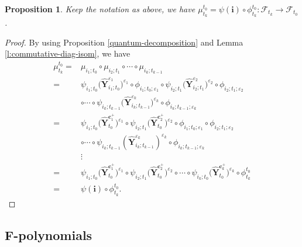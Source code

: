\documentclass[11pt]{article}
\numberwithin{equation}{section}
\numberwithin{equation}{section}
\newtheorem{Proposition}[Theorem]{Proposition}
 { \theoremstyle{definition}
\newtheorem{Definition}[Theorem]{Definition}
\newtheorem{Note}[Theorem]{Note}
\newtheorem{Example}[Theorem]{Example}
\newtheorem{Remark}[Theorem]{Remark} }
\begin{document}
\begin{Proposition}\label{long-quantum-decomposition}
 Keep the notation as above, we have
 $\mu_{t_k}^{t_0}=\psi(\mathbf{i})\circ\phi_{t_{k}}^{t_0}\colon  \mathcal{F}_{t_{k}}\to\mathcal{F}_{t_{0}}$.
\end{Proposition}
\begin{proof}
 By using Proposition \ref{quantum-decomposition} and Lemma \ref{l:commutative-diag-isom}, we have
 \begin{align*}
 \mu_{t_k}^{t_0}
 ={}&\mu_{i_1;t_0}\circ\mu_{i_2;t_1}\circ\cdots\circ\mu_{i_k;t_{k-1}}\\
 ={}&\psi_{i_{1};t_{0}}\bigl(\mathbf{\hat{Y}}_{i_{1};t_{0}}^{\varepsilon_{1}}\bigr)^{\varepsilon_{1}}\circ\phi_{i_{1};t_{0};\varepsilon_{1}}\circ\psi_{i_{2};t_{1}}
 \bigl(\mathbf{\hat{Y}}_{i_{2};t_{1}}^{\varepsilon_{2}}\bigr)^{\varepsilon_{2}}\circ\phi_{i_{2};t_{1};\varepsilon_{2}}\\
 &\circ\cdots\circ\psi_{i_{k};t_{k-1}}
 \bigl(\mathbf{\hat{Y}}_{i_{k};t_{k-1}}^{\varepsilon_{k}}\bigr)^{\varepsilon_{k}}\circ\phi_{i_{k};t_{k-1};\varepsilon_{k}}\\
 ={}&\psi_{i_{1};t_{0}}\bigl(\mathbf{\hat{Y}}_{t_{0}}^{\mathbf{c}_{1}^{+}}\bigr)^{\varepsilon_{1}}\circ\psi_{i_{2};t_{1}}\bigl(\mathbf{\hat{Y}}_{t_{0}}^{\mathbf{c}_{2}^{+}}\bigr)^{\varepsilon_{2}}\circ\phi_{i_{1};t_{0};\varepsilon_{1}}\circ\phi_{i_{2};t_{1};\varepsilon_{2}}\\
 &\circ\cdots\circ\psi_{i_{k};t_{k-1}}(\mathbf{\hat{Y}}_{i_{k};t_{k-1}}^{\varepsilon_{k}})^{\varepsilon_{k}}\circ\phi_{i_{k};t_{k-1};\varepsilon_{k}}\\
 &\vdots\\
 ={}&\psi_{i_{1};t_{0}}\bigl(\mathbf{\hat{Y}}_{t_{0}}^{\mathbf{c}_{1}^{+}}\bigr)^{\varepsilon_{1}}\circ\psi_{i_{2};t_{1}}\bigl(\mathbf{\hat{Y}}_{t_{0}}^{\mathbf{c}_{2}^{+}}\bigr)^{\varepsilon_{2}}\circ\cdots\circ\psi_{i_{k};t_{0}}
 \bigl(\mathbf{\hat{Y}}_{t_{0}}^{\mathbf{c}_{k}^{+}}\bigr)^{\varepsilon_{k}}\circ\phi_{t_{k}}^{t_0}\\
 ={}&\psi(\mathbf{i})\circ\phi_{t_{k}}^{t_0}.\tag*{\qed}
 \end{align*}\renewcommand{\qed}{}
\end{proof}

\subsection[F-polynomials]{$\boldsymbol{F}$-polynomials}\label{s:F-poly_gen_quantum_cluster_alg}
\end{document}
